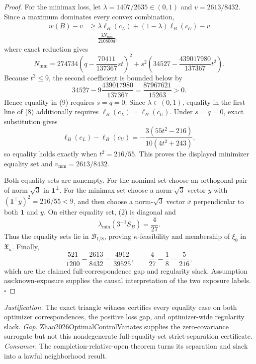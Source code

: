 \documentclass{article}
\begin{document}
\begin{proof}
For the minimax loss, let \(\lambda=1407/2635\in(0,1)\) and \(v=2613/8432\).  Since a maximum dominates every convex combination,
\[
\begin{aligned}
w(B)-v
&\ge \lambda\ell_B(c_L)+(1-\lambda)\ell_B(c_U)-v\\
&=\frac{3N_{\mathrm{mm}}}{210800d},
\end{aligned}
\tag{8}
\]
where exact reduction gives
\[
N_{\mathrm{mm}}
=274734\left(q-\frac{70411}{137367}st\right)^2
+s^2\left(34527-\frac{439017980}{137367}t^2\right).
\tag{9}
\]
Because \(t^2\le9\), the second coefficient is bounded below by
\[
34527-9\frac{439017980}{137367}
=\frac{87967621}{15263}>0.
\tag{10}
\]
Hence equality in (9) requires \(s=q=0\).  Since \(\lambda\in(0,1)\), equality in the first line of (8) additionally requires \(\ell_B(c_L)=\ell_B(c_U)\).  Under \(s=q=0\), exact substitution gives
\[
\ell_B(c_L)-\ell_B(c_U)
=-\frac{3(55t^2-216)}{10(4t^2+243)},
\tag{11}
\]
so equality holds exactly when \(t^2=216/55\).  This proves the displayed minimizer equality set and \(v_{\mathrm{mm}}=2613/8432\).

Both equality sets are nonempty.  For the nominal set choose an orthogonal pair of norm \(\sqrt3\) in \(\mathbf1^\perp\).  For the minimax set choose a norm-\(\sqrt3\) vector \(y\) with \((\mathbf1^{\top}y)^2=216/55<9\), and then choose a norm-\(\sqrt3\) vector \(x\) perpendicular to both \(\mathbf1\) and \(y\).  On either equality set, (2) is diagonal and
\[
\lambda_{\min}(3^{-1}S_B)=\frac4{27}.
\tag{12}
\]
Thus the equality sets lie in \(\mathcal B_{1/8}\), proving \(\kappa\)-feasibility and membership of \(\xi_0\) in \(\mathfrak X_\kappa\).  Finally,
\[
\frac{521}{1200}-\frac{2613}{8432}
=\frac{4912}{39525},
\qquad
\frac4{27}-\frac18=\frac5{216},
\tag{13}
\]
which are the claimed full-correspondence gap and regularity slack.  Assumption ass:known-exposure supplies the causal interpretation of the two exposure labels.  \(\square\)
\end{proof}
\par\smallskip\noindent \textit{Justification.} The exact triangle witness certifies every equality case on both optimizer correspondences, the positive loss gap, and optimizer-wide regularity slack. \textit{Gap.} Zhao2026OptimalControlVariates supplies the zero-covariance surrogate but not this nondegenerate full-equality-set strict-separation certificate. \textit{Consumer.} The completion-relative-open theorem turns its separation and slack into a lawful neighborhood result.
\end{document}
